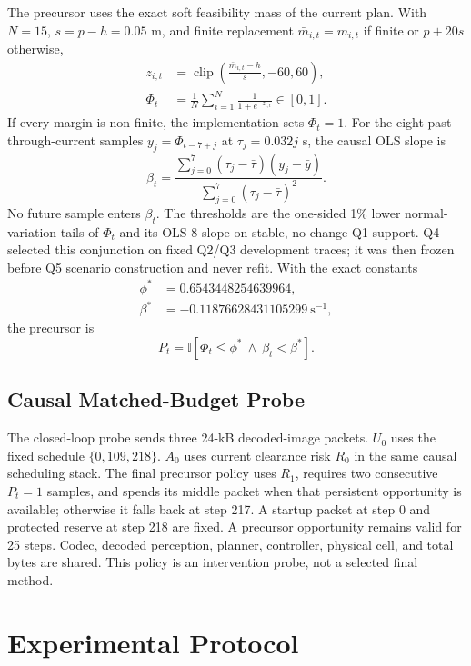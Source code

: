 \documentclass[letterpaper,10pt,conference]{ieeeconf}
\begin{document}
The precursor uses the exact soft feasibility mass of the current plan. With
$N=15$, $s=p-h=0.05$ m, and finite replacement
$\bar m_{i,t}=m_{i,t}$ if finite or $p+20s$ otherwise,
\begin{align}
z_{i,t}&=\operatorname{clip}\!\left(
\frac{\bar m_{i,t}-h}{s},-60,60\right),\\
\Phi_t&=\frac{1}{N}\sum_{i=1}^{N}\frac{1}{1+e^{-z_{i,t}}}\in[0,1].
\label{eq:softmass}
\end{align}
If every margin is non-finite, the implementation sets $\Phi_t=1$.
For the eight past-through-current samples $y_j=\Phi_{t-7+j}$ at
$\tau_j=0.032j$ s, the causal OLS slope is
\begin{equation}
\beta_t=\frac{\sum_{j=0}^{7}(\tau_j-\bar\tau)(y_j-\bar y)}
{\sum_{j=0}^{7}(\tau_j-\bar\tau)^2}.
\end{equation}
No future sample enters $\beta_t$. The thresholds are the one-sided 1\% lower
normal-variation tails of $\Phi_t$ and its OLS-8 slope on stable, no-change Q1
support. Q4 selected this conjunction on fixed Q2/Q3 development traces; it was
then frozen before Q5 scenario construction and never refit. With the exact
constants
\begin{align}
\phi^*&=0.6543448254639964,\nonumber\\
\beta^*&=-0.11876628431105299~\mathrm{s}^{-1},\nonumber
\end{align}
the precursor is
\begin{equation}
P_t=\mathbb I[\Phi_t\leq\phi^*\ \land\ \beta_t<\beta^*].
\label{eq:precursor}
\end{equation}

\subsection{Causal Matched-Budget Probe}
The closed-loop probe sends three 24-kB decoded-image packets. $U_0$ uses the
fixed schedule $\{0,109,218\}$. $A_0$ uses current clearance risk $R_0$ in the
same causal scheduling stack. The final precursor policy uses $R_1$, requires
two consecutive $P_t=1$ samples, and spends its middle packet when that
persistent opportunity is available; otherwise it falls back at step 217. A
startup packet at step 0 and protected reserve at step 218 are fixed. A
precursor opportunity remains valid for 25 steps. Codec, decoded perception,
planner, controller, physical cell, and total bytes are shared. This policy is
an intervention probe, not a selected final method.

\section{Experimental Protocol}
\end{document}
